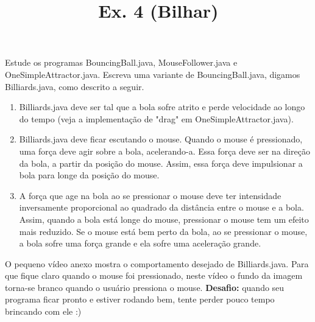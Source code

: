 \documentclass{article}
\title{Ex. 4 (Bilhar)}
\date{}
\author{}
\begin{document}
\maketitle

Estude os programas BouncingBall.java, MouseFollower.java e OneSimpleAttractor.java. Escreva uma variante de BouncingBall.java, digamos Billiards.java, como descrito a seguir.
\bigbreak
\begin{enumerate}
\item Billiards.java deve ser tal que a bola sofre atrito e perde velocidade ao longo do tempo (veja a implementa\c{c}\~ao de "drag" em OneSimpleAttractor.java).
\item Billiards.java deve ficar escutando o mouse. Quando o mouse \'e pressionado, uma força deve agir sobre a bola, acelerando-a. Essa for\c{c}a deve ser na dire\c{c}\~ao da bola, a partir da posi\c{c}\~ao do mouse. Assim, essa for\c{c}a deve impulsionar a bola para longe da posi\c{c}\~ao do mouse.
\item A for\c{c}a que age na bola ao se pressionar o mouse deve ter intensidade inversamente proporcional ao quadrado da dist\^ancia entre o mouse e a bola. Assim, quando a bola est\'a longe do mouse, pressionar o mouse tem um efeito mais reduzido. Se o mouse est\'a bem perto da bola, ao se pressionar o mouse, a bola sofre uma for\c{c}a grande e ela sofre uma acelera\c{c}\~ao grande.
\end{enumerate}
\bigbreak
O pequeno v\'ideo anexo mostra o comportamento desejado de Billiards.java. Para que fique claro quando o mouse foi pressionado, neste v\'ideo o fundo da imagem torna-se branco quando o usu\'ario pressiona o mouse.
\bigbreak
\textbf{Desafio:} quando seu programa ficar pronto e estiver rodando bem, tente perder pouco tempo brincando com ele :)
\end{document}
